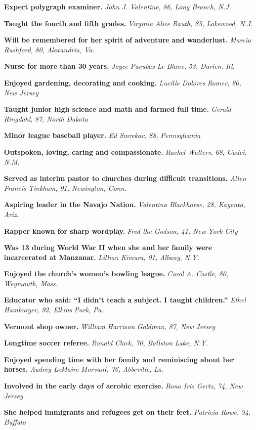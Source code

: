 \textbf{Expert polygraph examiner.} \emph{John J. Valentine, 86, Long
Branch, N.J.}

\textbf{Taught the fourth and fifth grades.} \emph{Virginia Alice Rauth,
85, Lakewood, N.J.}

\textbf{Will be remembered for her spirit of adventure and wanderlust.}
\emph{Marcia Rushford, 80, Alexandria, Va.}

\textbf{Nurse for more than 30 years.} \emph{Joyce Pacubas-Le Blanc, 53,
Darien, Ill.}

\textbf{Enjoyed gardening, decorating and cooking.} \emph{Lucille
Dolores Romer, 80, New Jersey}

\textbf{Taught junior high science and math and farmed full time.}
\emph{Gerald Ringdahl, 87, North Dakota}

\textbf{Minor league baseball player.} \emph{Ed Smrekar, 88,
Pennsylvania}

\textbf{Outspoken, loving, caring and compassionate.} \emph{Rachel
Walters, 68, Cudei, N.M.}

\textbf{Served as interim pastor to churches during difficult
transitions.} \emph{Allen Francis Tinkham, 91, Newington, Conn.}

\textbf{Aspiring leader in the Navajo Nation.} \emph{Valentina
Blackhorse, 28, Kayenta, Ariz.}

\textbf{Rapper known for sharp wordplay.} \emph{Fred the Godson, 41, New
York City}

\textbf{Was 13 during World War II when she and her family were
incarcerated at Manzanar.} \emph{Lillian Kimura, 91, Albany, N.Y.}

\textbf{Enjoyed the church's women's bowling league.} \emph{Carol A.
Castle, 80, Weymouth, Mass.}

\textbf{Educator who said: ``I didn't teach a subject. I taught
children.''} \emph{Ethel Hamburger, 92, Elkins Park, Pa.}

\textbf{Vermont shop owner.} \emph{William Harrison Goldman, 87, New
Jersey}

\textbf{Longtime soccer referee.} \emph{Ronald Clark, 70, Ballston Lake,
N.Y.}

\textbf{Enjoyed spending time with her family and reminiscing about her
horses.} \emph{Audrey LeMaire Morvant, 76, Abbeville, La.}

\textbf{Involved in the early days of aerobic exercise.} \emph{Rona Iris
Gertz, 74, New Jersey}

\textbf{She helped immigrants and refugees get on their feet.}
\emph{Patricia Rowe, 94, Buffalo}

